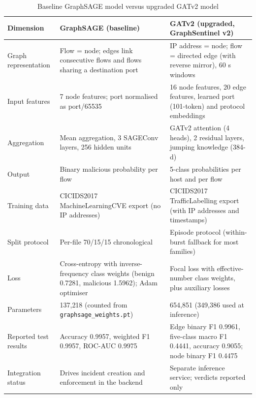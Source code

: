 \documentclass[12pt,a4paper]{report}
\begin{document}
\begin{table}[htbp]
\caption{Baseline GraphSAGE model versus upgraded GATv2 model}
\label{tab:model_evolution}
\centering
\begin{tabularx}{\textwidth}{|l|X|X|}
\hline
\textbf{Dimension} & \textbf{GraphSAGE (baseline)} & \textbf{GATv2 (upgraded, GraphSentinel v2)} \\
\hline
Graph representation & Flow = node; edges link consecutive flows and flows sharing a destination port & IP address = node; flow = directed edge (with reverse mirror), 60 s windows \\
\hline
Input features & 7 node features; port normalised as port/65535 & 16 node features, 20 edge features, learned port (101-token) and protocol embeddings \\
\hline
Aggregation & Mean aggregation, 3 SAGEConv layers, 256 hidden units & GATv2 attention (4 heads), 2 residual layers, jumping knowledge (384-d) \\
\hline
Output & Binary malicious probability per flow & 5-class probabilities per host and per flow \\
\hline
Training data & CICIDS2017 MachineLearningCVE export (no IP addresses) & CICIDS2017 TrafficLabelling export (with IP addresses and timestamps) \\
\hline
Split protocol & Per-file 70/15/15 chronological & Episode protocol (within-burst fallback for most families) \\
\hline
Loss & Cross-entropy with inverse-frequency class weights (benign 0.7281, malicious 1.5962); Adam optimiser & Focal loss with effective-number class weights, plus auxiliary losses \\
\hline
Parameters & 137{,}218 (counted from \texttt{graphsage\_weights.pt}) & 654{,}851 (349{,}386 used at inference) \\
\hline
Reported test results & Accuracy 0.9957, weighted F1 0.9957, ROC-AUC 0.9975 & Edge binary F1 0.9961, five-class macro F1 0.4441, accuracy 0.9055; node binary F1 0.4475 \\
\hline
Integration status & Drives incident creation and enforcement in the backend & Separate inference service; verdicts reported only \\
\hline
\end{tabularx}
\end{table}
\end{document}
